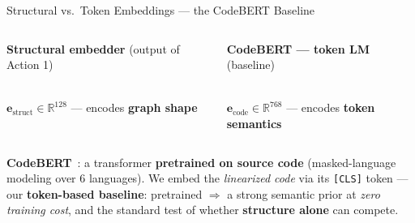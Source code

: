 \documentclass[aspectratio=169,10pt]{beamer}
\begin{document}
\begin{frame}[fragile]{Structural vs.\ Token Embeddings --- the CodeBERT Baseline}

  \begin{columns}[T]
    \begin{center}
      {\scriptsize\textbf{\textcolor{ccpg!60!black}{Structural embedder}}
        {\tiny\textcolor{notecol}{(output of Action 1)}}}\\[4pt]
      \\[4pt]
      {\scriptsize $\mathbf{e}_{\text{struct}}\in\mathbb{R}^{128}$ --- encodes \textbf{graph shape}}
    \end{center}

    \begin{center}
      {\scriptsize\textbf{\textcolor{c5!70!black}{CodeBERT --- token LM}}
        {\tiny\textcolor{notecol}{(baseline)}}}\\[4pt]
      \\[4pt]
      {\scriptsize $\mathbf{e}_{\text{code}}\in\mathbb{R}^{768}$ --- encodes \textbf{token semantics}}
    \end{center}
  \end{columns}

  \vspace{0.12cm}
  \begin{tcolorbox}[colback=c5!5, colframe=c5!55!black, boxrule=0.4pt,
    left=6pt, right=6pt, top=3pt, bottom=3pt, arc=3pt]
    \scriptsize
    \textbf{CodeBERT}~\cite{feng2020codebert}: a transformer \textbf{pretrained on source code}
    (masked-language modeling over 6 languages). We embed the \emph{linearized code} via its
    \texttt{[CLS]} token --- our \textbf{token-based baseline}: pretrained $\Rightarrow$ a strong
    semantic prior at \emph{zero training cost}, and the standard test of whether
    \textbf{structure alone} can compete.
  \end{tcolorbox}


\end{frame}
\end{document}
